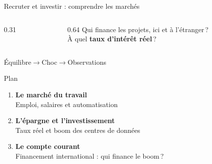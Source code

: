 \documentclass[aspectratio=169]{beamer}
\begin{document}
\begin{frame}{Recruter et investir : comprendre les marchés}
\begin{tcolorbox}[colback=HECgreen!7, colframe=HECgreen!7, boxrule=0pt, arc=8pt, left=10pt, right=10pt, top=10pt, bottom=10pt]
\begin{columns}[c,onlytextwidth]
\begin{column}{0.31\textwidth}
         \end{column}
         \begin{column}{0.64\textwidth}
            \RaggedRight\small
            Qui finance les projets, ici et à l’étranger\,?\\[5pt]
            À quel \textbf{taux d'intérêt réel}\,?
         \end{column}
      \end{columns}
   \end{tcolorbox}
   \vspace{0.25cm}
   \centering\small\textcolor{HECnavy}{Équilibre}\quad$\longrightarrow$\quad\textcolor{HECnavy}{Choc}\quad$\longrightarrow$\quad\textcolor{HECnavy}{Observations}
\end{frame}


\begin{frame}{Plan}
   \begin{enumerate}
      \setlength\itemsep{0.35cm}
      \item \textbf{Le marché du travail}\\
         {\small Emploi, salaires et automatisation}
      \item \textbf{L'épargne et l'investissement}\\
         {\small Taux réel et boom des centres de données}
      \item \textbf{Le compte courant}\\
         {\small Financement international : qui finance le boom\,?}
   \end{enumerate}
\end{frame}



\end{document}

